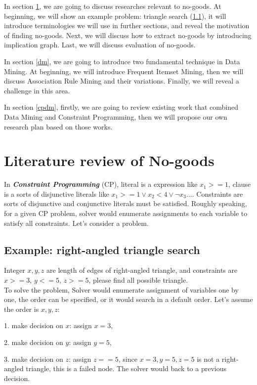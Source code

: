\documentclass{article}
\begin{document}
In section \ref{ng}, we are going to discuss researches relevant to no-goods. At beginning, we will show an example problem: triangle search (\ref{triangle search}), it will introduce terminologies we will use in further sections, and reveal the motivation of finding no-goods. Next, we will discuss how to extract no-goods by introducing implication graph. Last, we will discuss evaluation of no-goods.

In section \ref{dm}, we are going to introduce two fundamental technique in Data Mining. At beginning, we will introduce Frequent Itemset Mining, then we will discuss Association Rule Mining and their variations. Finally, we will reveal a challenge in this area.

In section \ref{cpdm}, firstly, we are going to review existing work that combined Data Mining and Constraint Programming, then we will propose our own research plan based on those works.

\section{Literature review of No-goods} \label{ng}

In \textbf{\textit{Constraint Programming}} (CP), literal is a expression like $x_1>=1$, clause is a sorts of disjunctive literals like $x_1 >= 1 \lor x_2<4 \lor \neg x_3 ...$. Constraints are sorts of disjunctive and conjunctive literals must be satisfied. Roughly speaking, for a given CP problem, solver would enumerate assignments to each variable to satisfy all constraints. Let's consider a problem.

\subsection{Example: right-angled triangle search} \label{triangle search}

Integer $x,y,z$ are length of edges of right-angled triangle, and constraints are $x>=3$, $y<=5$, $z>=5$, please find all possible triangle. \\
To solve the problem, Solver would enumerate assignment of variables one by one, the order can be specified, or it would search in a default order. Let's assume the order is $x, y, z$:

1. make decision on $x$: assign $x=3$,

2. make decision on $y$: assign $y=5$,

3. make decision on $z$: assign $z==5$, since $x=3, y=5, z=5$ is not a right-angled triangle, this is a failed node. The solver would back to a previous decision.
\end{document}
